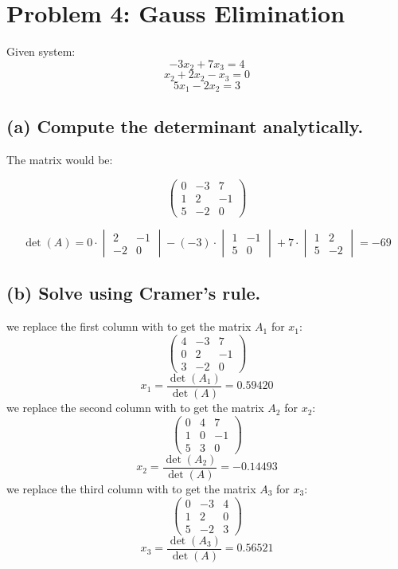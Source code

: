 \documentclass{article}
\begin{document}
\section*{Problem 4: Gauss Elimination}

Given system:
\[ -3x_2 + 7x_3 = 4 \]
\[ x_2 + 2x_2 - x_3 = 0 \]
\[ 5x_1 - 2x_2 = 3 \]

\subsection*{(a) Compute the determinant analytically.}
The matrix would be: 

\[ \begin{pmatrix} 0 & -3 & 7 \\ 1 & 2 & -1 \\ 5 & -2 & 0 \end{pmatrix} \]

\[
   \det(A) = 0 \cdot \begin{vmatrix} 2 & -1 \\ -2 & 0 \end{vmatrix} - (-3) \cdot \begin{vmatrix} 1 & -1 \\ 5 & 0 \end{vmatrix} + 7 \cdot \begin{vmatrix} 1 & 2 \\ 5 & -2 \end{vmatrix} = -69
\]
\subsection*{(b) Solve using Cramer's rule.}
we replace the first column with to get the matrix \( A_1 \) for \( x_1 \):
\[\begin{pmatrix}
   4 & -3 & 7 \\ 0 & 2 & -1 \\ 3 & -2 & 0
\end{pmatrix}\]
\[
   x_1 = \frac{\det(A_1)}{\det(A)} = 0.59420
\]
we replace the second column with to get the matrix \( A_2 \) for \( x_2 \):
\[\begin{pmatrix}
   0 & 4 & 7 \\ 1 & 0 & -1 \\ 5 & 3 & 0
\end{pmatrix}\]
\[
   x_2 = \frac{\det(A_2)}{\det(A)} = -0.14493
\]
we replace the third column with to get the matrix \( A_3 \) for \( x_3 \):
\[\begin{pmatrix}
   0 & -3 & 4 \\ 1 & 2 & 0 \\ 5 & -2 & 3
\end{pmatrix}\]
\[
   x_3 = \frac{\det(A_3)}{\det(A)} = 0.56521
\]
\end{document}
